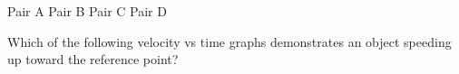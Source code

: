 \documentclass[../main-physics-problems.tex]{subfiles}
\begin{document}
\begin{questions}
{\color{white}
\begin{randomizeoneparchoices}[norandomize,]
    \choice Pair A
    \correctchoice Pair B
    \choice Pair C
    \choice Pair D
\end{randomizeoneparchoices}
}

\question 
Which of the following velocity vs time graphs demonstrates an object speeding up toward the reference point?

\begin{center}
\end{center}

\vspace{1ex}


\end{questions}
\end{document}
